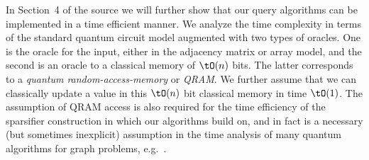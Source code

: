 In Section~4 of the source we will further show that our query algorithms can be implemented in a time efficient manner.  We analyze the time complexity in terms of the standard quantum circuit model augmented with two types of oracles.  
One is the oracle for the input, either in the adjacency matrix or array model, and the second is an oracle to a classical memory of $\tO(n)$ bits.  The latter corresponds to a \emph{quantum random-access-memory} or \emph{QRAM}.  We further assume that 
we can classically update a value in this $\tO(n)$ bit classical memory in time $\tO(1)$.  
The assumption of QRAM access is also required for the time efficiency of the sparsifier construction in \cite{AdW19} which our algorithms build on, and in fact is a necessary (but sometimes inexplicit) assumption in the time analysis of many quantum algorithms for graph problems, e.g.~\cite{DHHM06,Amb06,B13}.

